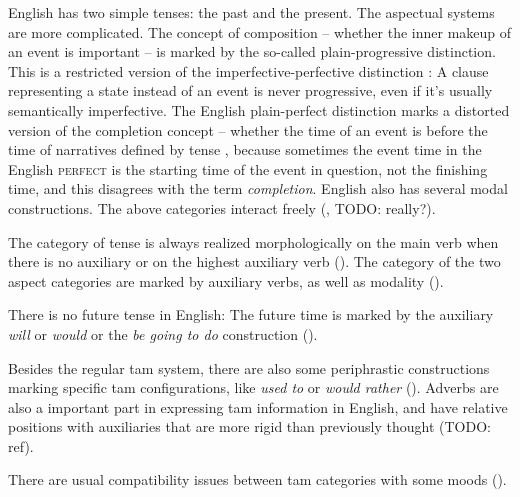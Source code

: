 \documentclass[UTF8, a4paper, oneside, scheme=plain]{ctexrep}
\newcommand*{\citesec}[1]{\S~{#1}}
\newcommand*{\term}[1]{\emph{#1}}
\newcommand{\corpus}[1]{\emph{#1}}
\newcommand{\category}[1]{\textsc{#1}}
\begin{document}
English has two simple tenses: the past and the present.
The aspectual systems are more complicated. 
The concept of composition 
-- whether the inner makeup of an event is important \citep[\citesec{19.10}]{dixon2012basic3} -- 
is marked by the so-called plain-progressive distinction.
This is a restricted version of the imperfective-perfective distinction \citep{dixon2012basic3}:
A clause representing a state instead of an event 
is never progressive,
even if it's usually semantically imperfective.
The English plain-perfect distinction marks 
a distorted version of the completion concept 
-- whether the time of an event is before the time of narratives defined by tense 
\citep[\citesec{19.7}]{dixon2012basic3},
because sometimes the event time in the English \category{perfect} 
is the starting time of the event in question,
not the finishing time,
and this disagrees with the term \term{completion}.
English also has several modal constructions.
The above categories interact freely (, TODO: really?).

The category of tense is always realized morphologically 
on the main verb when there is no auxiliary 
or on the highest auxiliary verb ().
The category of the two aspect categories are marked by auxiliary verbs, 
as well as modality (). 

There is no future tense in English:
The future time is marked by the auxiliary \corpus{will} or \corpus{would} 
or the \corpus{be going to do} construction ().

Besides the regular \acs{tam} system,
there are also some periphrastic constructions marking specific \acs{tam} configurations,
like \corpus{used to} or \corpus{would rather} ().
Adverbs are also a important part in expressing \acs{tam} information in English,
and have relative positions with auxiliaries that are more rigid than previously thought (TODO: ref).

There are usual compatibility issues between \acs{tam} categories 
with some moods ().
\end{document}
